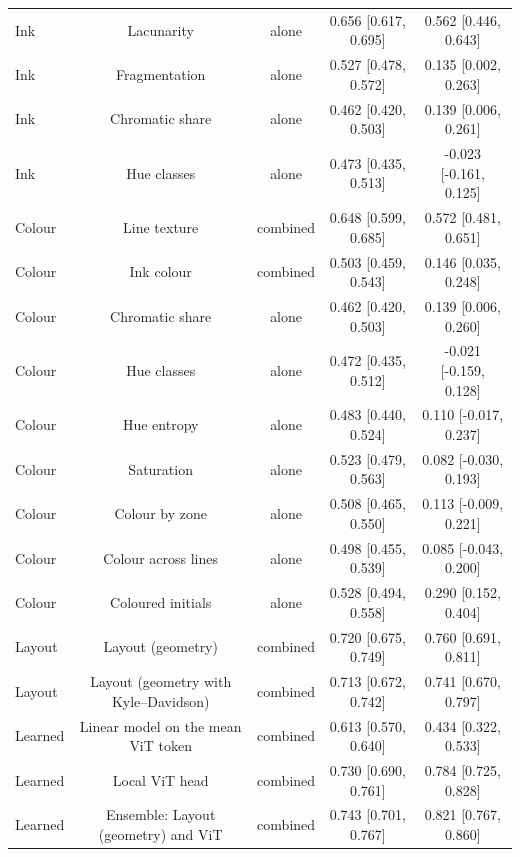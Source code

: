 \begin{table}[htbp]
\begin{tabular}{lcccc}
    Ink & Lacunarity & alone & 0.656 [0.617, 0.695] & 0.562 [0.446, 0.643] \\
    Ink & Fragmentation & alone & 0.527 [0.478, 0.572] & 0.135 [0.002, 0.263] \\
    Ink & Chromatic share & alone & 0.462 [0.420, 0.503] & 0.139 [0.006, 0.261] \\
    Ink & Hue classes & alone & 0.473 [0.435, 0.513] & -0.023 [-0.161, 0.125] \\
    Colour & Line texture & combined & 0.648 [0.599, 0.685] & 0.572 [0.481, 0.651] \\
    Colour & Ink colour & combined & 0.503 [0.459, 0.543] & 0.146 [0.035, 0.248] \\
    Colour & Chromatic share & alone & 0.462 [0.420, 0.503] & 0.139 [0.006, 0.260] \\
    Colour & Hue classes & alone & 0.472 [0.435, 0.512] & -0.021 [-0.159, 0.128] \\
    Colour & Hue entropy & alone & 0.483 [0.440, 0.524] & 0.110 [-0.017, 0.237] \\
    Colour & Saturation & alone & 0.523 [0.479, 0.563] & 0.082 [-0.030, 0.193] \\
    Colour & Colour by zone & alone & 0.508 [0.465, 0.550] & 0.113 [-0.009, 0.221] \\
    Colour & Colour across lines & alone & 0.498 [0.455, 0.539] & 0.085 [-0.043, 0.200] \\
    Colour & Coloured initials & alone & 0.528 [0.494, 0.558] & 0.290 [0.152, 0.404] \\
    Layout & Layout (geometry) & combined & 0.720 [0.675, 0.749] & 0.760 [0.691, 0.811] \\
    Layout & Layout (geometry with Kyle--Davidson) & combined & 0.713 [0.672, 0.742] & 0.741 [0.670, 0.797] \\
    Learned & Linear model on the mean ViT token & combined & 0.613 [0.570, 0.640] & 0.434 [0.322, 0.533] \\
    Learned & Local ViT head & combined & 0.730 [0.690, 0.761] & 0.784 [0.725, 0.828] \\
    Learned & Ensemble: Layout (geometry) and ViT & combined & 0.743 [0.701, 0.767] & 0.821 [0.767, 0.860] \\
    \bottomrule
  \end{tabular}
\end{table}
